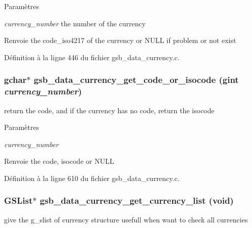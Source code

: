 \begin{DoxyParams}{Paramètres}
\item[{\em currency\_\-number}]the number of the currency\end{DoxyParams}
\begin{DoxyReturn}{Renvoie}
the code\_\-iso4217 of the currency or NULL if problem or not exist 
\end{DoxyReturn}


Définition à la ligne 446 du fichier gsb\_\-data\_\-currency.c.

\subsubsection[{gsb\_\-data\_\-currency\_\-get\_\-code\_\-or\_\-isocode}]{\setlength{\rightskip}{0pt plus 5cm}gchar$\ast$ gsb\_\-data\_\-currency\_\-get\_\-code\_\-or\_\-isocode (gint {\em currency\_\-number})}\label{gsb__data__currency_8c_ab8327a4b2ece3d38dab932c9872b850b}
return the code, and if the currency has no code, return the isocode


\begin{DoxyParams}{Paramètres}
\item[{\em currency\_\-number}]\end{DoxyParams}
\begin{DoxyReturn}{Renvoie}
the code, isocode or NULL 
\end{DoxyReturn}


Définition à la ligne 610 du fichier gsb\_\-data\_\-currency.c.

\subsubsection[{gsb\_\-data\_\-currency\_\-get\_\-currency\_\-list}]{\setlength{\rightskip}{0pt plus 5cm}GSList$\ast$ gsb\_\-data\_\-currency\_\-get\_\-currency\_\-list (void)}\label{gsb__data__currency_8c_a147d01fc4583c3c4c34189cff9611db1}
give the g\_\-slist of currency structure usefull when want to check all currencies


